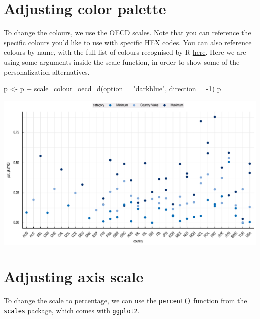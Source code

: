 \documentclass[
  11pt,
  oneside]{report}
\newenvironment{Shaded}{\begin{snugshade}}{\end{snugshade}}
\newcommand{\AttributeTok}[1]{\textcolor[rgb]{0.77,0.63,0.00}{#1}}
\newcommand{\DecValTok}[1]{\textcolor[rgb]{0.00,0.00,0.81}{#1}}
\newcommand{\FunctionTok}[1]{\textcolor[rgb]{0.00,0.00,0.00}{#1}}
\newcommand{\NormalTok}[1]{#1}
\newcommand{\OtherTok}[1]{\textcolor[rgb]{0.56,0.35,0.01}{#1}}
\newcommand{\SpecialCharTok}[1]{\textcolor[rgb]{0.00,0.00,0.00}{#1}}
\newcommand{\StringTok}[1]{\textcolor[rgb]{0.31,0.60,0.02}{#1}}
\begin{document}
\hypertarget{adjusting-color-palette-1}{%
\section{Adjusting color palette}\label{adjusting-color-palette-1}}

To change the colours, we use the OECD scales. Note that you can
reference the specific colours you'd like to use with specific HEX
codes. You can also reference colours by name, with the full list of
colours recognised by R
\href{http://www.stat.columbia.edu/~tzheng/files/Rcolor.pdf}{here}. Here
we are using some arguments inside the scale function, in order to show
some of the personalization alternatives.

\begin{Shaded}
\begin{Highlighting}[]
\NormalTok{p }\OtherTok{\textless{}{-}}\NormalTok{ p }\SpecialCharTok{+}
  \FunctionTok{scale\_colour\_oecd\_d}\NormalTok{(}\AttributeTok{option =} \StringTok{"darkblue"}\NormalTok{, }\AttributeTok{direction =} \SpecialCharTok{{-}}\DecValTok{1}\NormalTok{)}
\NormalTok{p}
\end{Highlighting}
\end{Shaded}

\begin{center}\includegraphics{book_figures/scatterplot_3-1} \end{center}

\hypertarget{adjusting-axis-scale-1}{%
\section{Adjusting axis scale}\label{adjusting-axis-scale-1}}

To change the scale to percentage, we can use the \texttt{percent()}
function from the \texttt{scales} package, which comes with
\texttt{ggplot2}.
\end{document}
